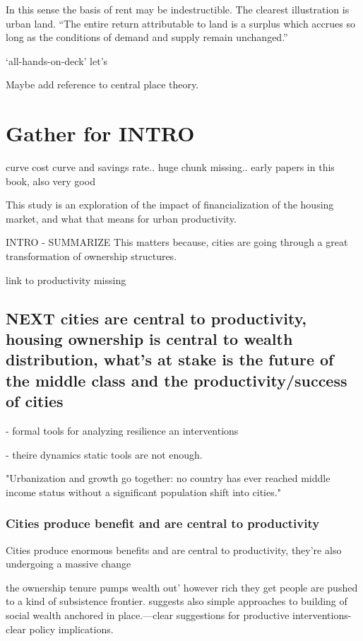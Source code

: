  In this sense the basis of rent may be indestructible. The clearest illustration is urban land.
``The entire return attributable to land is a surplus which accrues so long as the conditions of demand and supply remain unchanged.''

‘all-hands-on-deck’
let’s


Maybe add reference to central place theory. %

\chapter{Gather for INTRO}


\cite{spenceUrbanizationGrowth2009} 
curve cost curve and savings rate.. huge chunk missing..
early papers in this book, also very good


This study is an exploration of the impact of financialization of the housing market, and what that means for urban productivity.

INTRO - SUMMARIZE 
This matters because, %
cities are going through a great transformation of ownership structures. 

link to productivity missing


\section{NEXT cities are central to productivity, housing ownership is central to wealth distribution, what's at stake is the future of the middle class and the productivity/success of cities}
- formal tools for analyzing resilience an interventions

- theire dynamics static tools are not enough. 

"Urbanization and growth go together: no country has ever reached middle income status without a significant population shift into cities." \cite{annezUrbanizationGrowthSetting2009} %

\subsection{Cities produce benefit and are central to productivity}
Cities produce enormous benefits and are central to productivity, they're also undergoing a massive change

the ownership tenure pumps wealth out'
however rich they get people are pushed to a kind of subsistence frontier. 
suggests also simple approaches to building of social wealth anchored in place.---clear suggestions for productive interventions- clear policy implications. 

